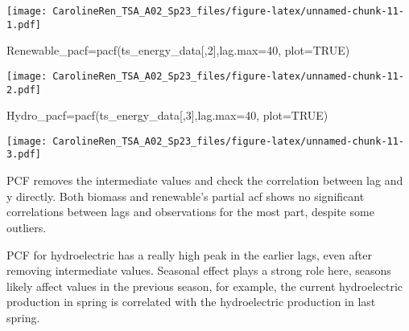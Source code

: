 \documentclass[
]{article}
\newenvironment{Shaded}{\begin{snugshade}}{\end{snugshade}}
\newcommand{\AttributeTok}[1]{\textcolor[rgb]{0.77,0.63,0.00}{#1}}
\newcommand{\ConstantTok}[1]{\textcolor[rgb]{0.00,0.00,0.00}{#1}}
\newcommand{\DecValTok}[1]{\textcolor[rgb]{0.00,0.00,0.81}{#1}}
\newcommand{\FunctionTok}[1]{\textcolor[rgb]{0.00,0.00,0.00}{#1}}
\newcommand{\NormalTok}[1]{#1}
\newcommand{\OtherTok}[1]{\textcolor[rgb]{0.56,0.35,0.01}{#1}}
\begin{document}
\texttt{[image: CarolineRen\_TSA\_A02\_Sp23\_files/figure-latex/unnamed-chunk-11-1.pdf]}

\begin{Shaded}
\begin{Highlighting}[]
\NormalTok{Renewable\_pacf}\OtherTok{=}\FunctionTok{pacf}\NormalTok{(ts\_energy\_data[,}\DecValTok{2}\NormalTok{],}\AttributeTok{lag.max=}\DecValTok{40}\NormalTok{, }\AttributeTok{plot=}\ConstantTok{TRUE}\NormalTok{)}
\end{Highlighting}
\end{Shaded}

\texttt{[image: CarolineRen\_TSA\_A02\_Sp23\_files/figure-latex/unnamed-chunk-11-2.pdf]}

\begin{Shaded}
\begin{Highlighting}[]
\NormalTok{Hydro\_pacf}\OtherTok{=}\FunctionTok{pacf}\NormalTok{(ts\_energy\_data[,}\DecValTok{3}\NormalTok{],}\AttributeTok{lag.max=}\DecValTok{40}\NormalTok{, }\AttributeTok{plot=}\ConstantTok{TRUE}\NormalTok{)}
\end{Highlighting}
\end{Shaded}

\texttt{[image: CarolineRen\_TSA\_A02\_Sp23\_files/figure-latex/unnamed-chunk-11-3.pdf]}

PCF removes the intermediate values and check the correlation between
lag and y directly. Both biomass and renewable's partial acf shows no
significant correlations between lags and observations for the most
part, despite some outliers.

PCF for hydroelectric has a really high peak in the earlier lags, even
after removing intermediate values. Seasonal effect plays a strong role
here, seasons likely affect values in the previous season, for example,
the current hydroelectric production in spring is correlated with the
hydroelectric production in last spring.
\end{document}
